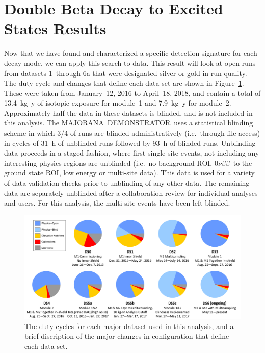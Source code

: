 \documentclass[notitlepage,rmp,aps,10pt]{revtex4-1}
\newcommand{\MJ}{M{\footnotesize AJORANA}}
\newcommand{\Demo}{D{\footnotesize EMON\-STRAT\-OR}}
\newcommand{\MJD}{\MJ\ \Demo}
\newcommand{\znbb}{${0 \nu \beta \beta}$}
\begin{document}
\section{Double Beta Decay to Excited States Results}
Now that we have found and characterized a specific detection signature for each decay mode, we can apply this search to data.
This result will look at open runs from datasets 1~through 6a that were designated silver or gold in run quality.
The duty cycle and changes that define each data set are shown in Figure~\ref{fig:dutycycle}.
These were taken from January~12, 2016 to April~18, 2018, and contain a total of 13.4~kg~y of isotopic exposure for module~1 and 7.9~kg~y for module~2.
Approximately half the data in these datasets is blinded, and is not included in this analysis.
The \MJD\ uses a statistical blinding scheme in which 3/4 of runs are blinded administratively (i.e.~through file access) in cycles of 31~h of unblinded runs followed by 93~h of blinded runs.
Unblinding data proceeds in a staged fashion, where first single-site events, not including any interesting physics regions are unblinded (i.e.~no background ROI, \znbb\ to the ground state ROI, low energy or multi-site data).
This data is used for a variety of data validation checks prior to unblinding of any other data.
The remaining data are separately unblinded after a collaboration review for individual analyses and users.
For this analysis, the multi-site events have been left blinded.

\begin{figure}[h]
  \centering
  \includegraphics[width=0.9\linewidth]{dutycycle}
  \caption[Dataset and Duty Cycle Summary]{\label{fig:dutycycle}
    The duty cycles for each major dataset used in this analysis, and a brief discription of the major changes in configuration that define each data set.
  }
\end{figure}
\end{document}
